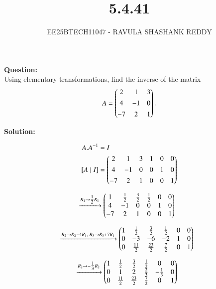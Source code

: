 \documentclass[journal]{article}
\begin{document}
	
	
	\vspace{3cm}
	
\title{5.4.41}
\author{EE25BTECH11047 - RAVULA SHASHANK REDDY}
\maketitle
\hrulefill
\bigskip 

\renewcommand{\thetable}{\theenumi}
\setlength{\intextsep}{10pt}

\textbf{Question:} \\

Using elementary transformations, find the inverse of the matrix
\begin{align*}
    A=\begin{pmatrix}2 & 1 & 3 \\[4pt] 4 & -1 & 0 \\[4pt] -7 & 2 & 1\end{pmatrix}.
\end{align*}

\textbf{Solution:}

\begin{align}
A.A^{-1}&=I\\
[A\mid I] &= 
\begin{pmatrix}2 & 1 & 3 & 1 & 0 & 0 \\[4pt]
       4 & -1 & 0 & 0 & 1 & 0 \\[4pt]
      -7 & 2 & 1 & 0 & 0 & 1\end{pmatrix}
\end{align}

\begin{align}
&\xrightarrow{R_1 \to \tfrac12 R_1}
\begin{pmatrix}1 & \tfrac12 & \tfrac32 & \tfrac12 & 0 & 0 \\
       4 & -1 & 0 & 0 & 1 & 0 \\
      -7 & 2 & 1 & 0 & 0 & 1\end{pmatrix}
\end{align}

\begin{align}
&\xrightarrow{R_2 \to R_2-4R_1,\; R_3 \to R_3+7R_1}
\begin{pmatrix}1 & \tfrac12 & \tfrac32 & \tfrac12 & 0 & 0 \\
       0 & -3 & -6 & -2 & 1 & 0 \\
       0 & \tfrac{11}{2} & \tfrac{23}{2} & \tfrac{7}{2} & 0 & 1\end{pmatrix}
\end{align}

\begin{align}
&\xrightarrow{R_2 \to -\tfrac13 R_2}
\begin{pmatrix}1 & \tfrac12 & \tfrac32 & \tfrac12 & 0 & 0 \\
       0 & 1 & 2 & \tfrac23 & -\tfrac13 & 0 \\
       0 & \tfrac{11}{2} & \tfrac{23}{2} & \tfrac{7}{2} & 0 & 1\end{pmatrix}
\end{align}
\end{document}
